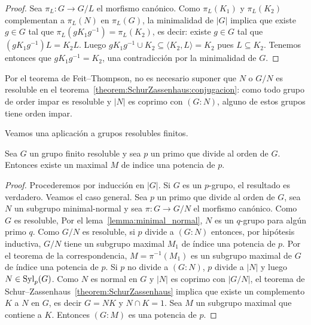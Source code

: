\begin{proof}
	Sea $\pi_L\colon G\to G/L$ el morfismo canónico. Como
	$\pi_L(K_1)$ y $\pi_L(K_2)$ complementan a $\pi_L(N)$ en $\pi_L(G)$, la minimalidad
	de $|G|$ implica que existe $g\in G$ tal que $\pi_L(gK_1g^{-1})=\pi_L(K_2)$, es
	decir: existe $g\in G$ tal que $(gK_1g^{-1})L=K_2L$.  Luego $gK_1g^{-1}\cup
	K_2\subseteq \langle K_2,L\rangle=K_2$ pues $L\subseteq K_2$. Tenemos entonces que
	$gK_1g^{-1}=K_2$, una contradicción por la minimalidad de $G$. 
%
\end{proof}


	Por el teorema de Feit--Thompson, no es necesario suponer que $N$ o $G/N$
	es resoluble en el teorema~\ref{theorem:SchurZassenhaus:conjugacion}: como
	todo grupo de order impar es resoluble y $|N|$ es coprimo con $(G:N)$,
	alguno de estos grupos tiene orden impar.


Veamos una aplicación a grupos resolubles finitos.

\begin{theorem}
	\label{theorem:solvable_maximal}
	Sea $G$ un grupo finito resoluble y sea $p$ un primo que divide al orden de $G$.
	Entonces existe un maximal $M$ de indice una potencia de $p$.
\end{theorem}

\begin{proof}
	Procederemos por inducción en $|G|$. Si $G$ es un $p$-grupo, el resultado
	es verdadero. Veamos el caso general. Sea $p$ un primo que divide al orden
	de $G$, sea $N$ un subgrupo minimal-normal y sea $\pi\colon G\to G/N$ el
	morfismo canónico. Como $G$ es resoluble, Por el lema~\ref{lemma:minimal_normal}, $N$ es un
	$q$-grupo para algún primo $q$. Como $G/N$ es resoluble, si $p$ divide a
	$(G:N)$ entonces, por hipótesis inductiva, $G/N$ tiene un subgrupo maximal
	$M_1$ de índice una potencia de $p$. Por el teorema de la correspondencia,
	$M=\pi^{-1}(M_1)$ es un subgrupo maximal de $G$ de índice una potencia de
	$p$. Si $p$ no divide a $(G:N)$, $p$ divide a $|N|$ y luego
	$N\in\mathrm{Syl}_p(G)$. Como $N$ es normal en $G$ y $|N|$ es coprimo con $|G/N|$,
	el teorema de Schur--Zassenhaus~\ref{theorem:SchurZassenhaus} implica que
	existe un complemento $K$ a $N$ en $G$, es decir $G=NK$ y $N\cap K=1$. Sea
	$M$ un subgrupo maximal que contiene a $K$. Entonces $(G:M)$ es una
	potencia de $p$.
\end{proof}

